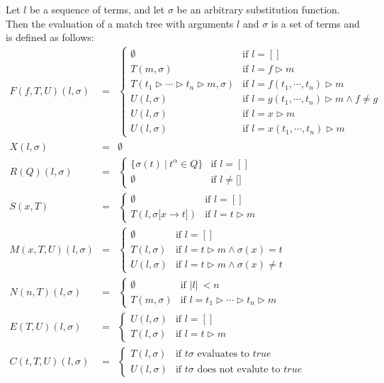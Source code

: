 \documentclass{article}
\begin{document}
Let $l$ be a sequence of terms, and let $\sigma $ be an arbitrary
substitution function. Then the evaluation of a match tree with arguments $l$
and $\sigma $ is a set of terms and is defined as follows:%
\begin{equation*}
\begin{array}{lll}
F(f,T,U)(l,\sigma ) & = & \left\{ 
\begin{array}{ll}
\emptyset  & \text{if }l=[] \\ 
T(m,\sigma ) & \text{if }l=f\rhd m \\ 
T(t_{1}\rhd \cdots \rhd t_{n}\rhd m,\sigma ) & \text{if }l=f(t_{1},\cdots
,t_{n})\rhd m \\ 
U(l,\sigma ) & \text{if }l=g(t_{1},\cdots ,t_{n})\rhd m\wedge f\neq g \\ 
U(l,\sigma ) & \text{if }l=x\rhd m \\ 
U(l,\sigma ) & \text{if }l=x(t_{1},\cdots ,t_{n})\rhd m%
\end{array}%
\right.  \\ 
X(l,\sigma ) & = & \emptyset  \\ 
R(Q)(l,\sigma ) & = & \left\{ 
\begin{array}{ll}
\{\sigma (t)\ |\ t^{\alpha }\in Q\} & \text{if }l=[] \\ 
\emptyset  & \text{if }l\neq \lbrack ]%
\end{array}%
\right.  \\ 
S(x,T) & = & \left\{ 
\begin{array}{ll}
\emptyset  & \text{if }l=[] \\ 
T(l,\sigma \lbrack x\rightarrow t]) & \text{if }l=t\rhd m%
\end{array}%
\right.  \\ 
M(x,T,U)(l,\sigma ) & = & \left\{ 
\begin{array}{ll}
\emptyset  & \text{if }l=[] \\ 
T(l,\sigma ) & \text{if }l=t\rhd m\wedge \sigma (x)=t \\ 
U(l,\sigma ) & \text{if }l=t\rhd m\wedge \sigma (x)\neq t%
\end{array}%
\right.  \\ 
N(n,T)(l,\sigma ) & = & \left\{ 
\begin{array}{ll}
\emptyset  & \text{if }|l|\ <n \\ 
T(m,\sigma ) & \text{if }l=t_{1}\rhd \cdots \rhd t_{n}\rhd m%
\end{array}%
\right.  \\ 
E(T,U)(l,\sigma ) & = & \left\{ 
\begin{array}{ll}
U(l,\sigma ) & \text{if }l=[] \\ 
T(l,\sigma ) & \text{if }l=t\rhd m%
\end{array}%
\right.  \\ 
C(t,T,U)(l,\sigma ) & = & \left\{ 
\begin{array}{ll}
T(l,\sigma ) & \text{if }t\sigma \text{ evaluates to }true \\ 
U(l,\sigma ) & \text{if }t\sigma \text{ does not evalute to }true%
\end{array}%
\right. 
\end{array}%
\end{equation*}%
\end{document}
